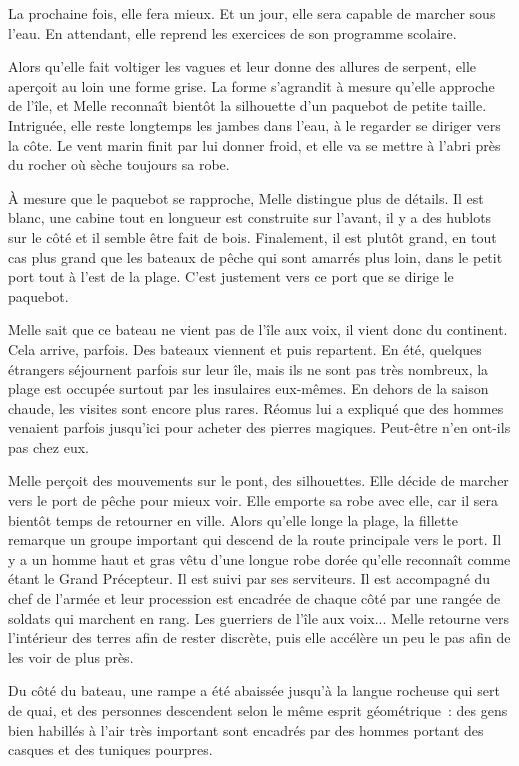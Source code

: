 La prochaine fois, elle fera mieux. Et un jour, elle sera capable de marcher sous l'eau. En attendant, elle reprend les exercices de son programme scolaire.

Alors qu'elle fait voltiger les vagues et leur donne des allures de serpent, elle aperçoit au loin une forme grise. La forme s'agrandit à mesure qu'elle approche de l'île, et Melle reconnaît bientôt la silhouette d'un paquebot de petite taille. Intriguée, elle reste longtemps les jambes dans l'eau, à le regarder se diriger vers la côte. Le vent marin finit par lui donner froid, et elle va se mettre à l'abri près du rocher où sèche toujours sa robe.

À mesure que le paquebot se rapproche, Melle distingue plus de détails. Il est blanc, une cabine tout en longueur est construite sur l'avant, il y a des hublots sur le côté et il semble être fait de bois. Finalement, il est plutôt grand, en tout cas plus grand que les bateaux de pêche qui sont amarrés plus loin, dans le petit port tout à l'est de la plage. C'est justement vers ce port que se dirige le paquebot.

Melle sait que ce bateau ne vient pas de l'île aux voix, il vient donc du continent. Cela arrive, parfois. Des bateaux viennent et puis repartent. En été, quelques étrangers séjournent parfois sur leur île, mais ils ne sont pas très nombreux, la plage est occupée surtout par les insulaires eux-mêmes. En dehors de la saison chaude, les visites sont encore plus rares. Réomus lui a expliqué que des hommes venaient parfois jusqu'ici pour acheter des pierres magiques. Peut-être n'en ont-ils pas chez eux.

Melle perçoit des mouvements sur le pont, des silhouettes. Elle décide de marcher vers le port de pêche pour mieux voir. Elle emporte sa robe avec elle, car il sera bientôt temps de retourner en ville. Alors qu'elle longe la plage, la fillette remarque un groupe important qui descend de la route principale vers le port. Il y a un homme haut et gras vêtu d'une longue robe dorée qu'elle reconnaît comme étant le Grand Précepteur. Il est suivi par ses serviteurs. Il est accompagné du chef de l'armée et leur procession est encadrée de chaque côté par une rangée de soldats qui marchent en rang. Les guerriers de l'île aux voix... Melle retourne vers l'intérieur des terres afin de rester discrète, puis elle accélère un peu le pas afin de les voir de plus près.

Du côté du bateau, une rampe a été abaissée jusqu'à la langue rocheuse qui sert de quai, et des personnes descendent selon le même esprit géométrique~: des gens bien habillés à l'air très important sont encadrés par des hommes portant des casques et des tuniques pourpres.

